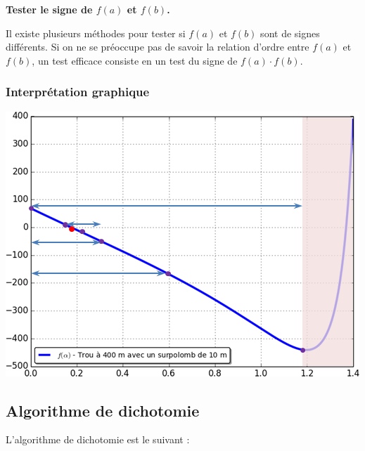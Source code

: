 \documentclass[10pt]{article}
\begin{document}
\begin{rem}
\textbf{Tester le signe de $f(a)$ et $f(b)$.}

Il existe plusieurs méthodes pour tester si $f(a)$ et $f(b)$ sont de signes différents. Si on ne se préoccupe pas de savoir la relation d'ordre entre $f(a)$ et $f(b)$, un test efficace consiste en un test du signe de $f(a)\cdot f(b)$. 
\end{rem}

\subsubsection*{Interprétation graphique}

\begin{center}
\includegraphics[width=.6\textwidth]{images/InterpretationG}
\end{center}


\subsection{Algorithme de dichotomie}

L'algorithme de dichotomie est le suivant :
\end{document}

